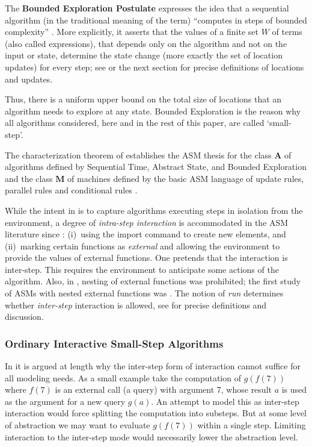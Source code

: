\documentclass{LMCS}
\theoremstyle{definition}
\newcommand{\bld}[1]{\ensuremath{\mathbf {#1}}}
\begin{document}
The \textbf{Bounded Exploration Postulate} expresses the idea that a
sequential algorithm (in the traditional meaning of the term)
``computes in steps of bounded complexity'' \cite{K53}.  More
explicitly, it asserts that the values of a finite set $W$ of terms
(also called expressions), that depends only on the algorithm and not
on the input or state, determine the state change (more exactly the
set of location updates) for every step; see \cite{lipari,seqth} or
the next section for precise definitions of locations and updates.

Thus, there is a uniform upper bound on the total size of locations
that an algorithm needs to explore at any state.  Bounded Exploration
is the reason why all algorithms considered, here and in the rest of
this paper, are called `small-step'.

The characterization theorem of \cite{seqth} establishes the ASM
thesis for the class \bld{A} of algorithms defined by Sequential Time,
Abstract State, and Bounded Exploration and the class \bld{M} of
machines defined by the basic ASM language of update rules, parallel
rules and conditional rules \cite{tutorial,lipari,seqth}.

While the intent in \cite{seqth} is to capture algorithms executing
steps in isolation from the environment, a degree of \emph{intra-step
  interaction} is accommodated in the ASM literature since
\cite{lipari}: (i)~using the import command to create new elements,
and (ii)~marking certain functions as \emph{external} and allowing the
environment to provide the values of external functions.  One pretends
that the interaction is inter-step.  This requires the environment to
anticipate some actions of the algorithm.  Also, in \cite{lipari},
nesting of external functions was prohibited; the first study of ASMs
with nested external functions was \cite{oa2}.  The notion of
\emph{run} determines whether \emph{inter-step} interaction is
allowed, see \cite{lipari,seqth} for precise definitions and
discussion.


\subsubsection{Ordinary Interactive Small-Step
Algorithms}\label{sec:overview:oa}

In \cite{oa1} it is argued at length why the inter-step form of
interaction cannot suffice for all modeling needs.  As a small example
take the computation of $g(f(7))$ where $f(7)$ is an external call (a
query) with argument 7, whose result $a$ is used as the argument for a
new query $g(a)$.  An attempt to model this as inter-step interaction
would force splitting the computation into substeps. But at some level
of abstraction we may want to evaluate $g(f(7))$ within a single step.
Limiting interaction to the inter-step mode would necessarily lower
the abstraction level.
\end{document}
